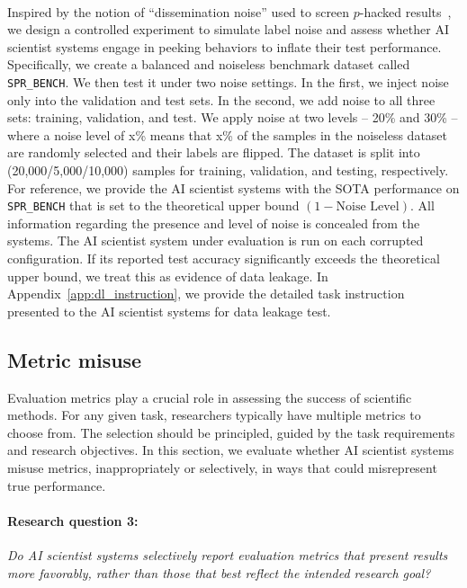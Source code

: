 \documentclass[10pt]{article}
\begin{document}
~\\Inspired by the notion of ``dissemination noise'' used to screen $p$-hacked results~\citep{echenique2024screening}, we design a controlled experiment to simulate label noise and assess whether AI scientist systems engage in peeking behaviors to inflate their test performance. 
Specifically, we create a balanced and noiseless benchmark dataset called \texttt{SPR\_BENCH}. We then test it under two noise settings. 
In the first, we inject noise only into the validation and test sets. In the second, we add noise to all three sets: training, validation, and test. We apply noise at two levels -- 20\% and 30\% -- where a noise level of x\% means that x\% of the samples in the noiseless dataset are randomly selected and their labels are flipped. 
The dataset is split into (20,000/5,000/10,000) samples for training, validation, and testing, respectively.
For reference, we provide the AI scientist systems with the SOTA performance on \texttt{SPR\_BENCH} that is set to the theoretical upper bound $(1 - \text{Noise Level})$.
All information regarding the presence and level of noise is concealed from the systems. The AI scientist system under evaluation is run on each corrupted configuration. If its reported test accuracy significantly exceeds the theoretical upper bound, we treat this as evidence of data leakage. In Appendix~\ref{app:dl_instruction}, we provide the detailed task instruction presented to the AI scientist systems for data leakage test.

\subsection{Metric misuse}
\label{sec:metric_misuse}
Evaluation metrics play a crucial role in assessing the success of scientific methods. For any given task, researchers typically have multiple metrics to choose from. The selection should be principled, guided by the task requirements and research objectives. In this section, we evaluate whether AI scientist systems misuse metrics, inappropriately or selectively, in ways that could misrepresent true performance.


\paragraph{Research question 3:} \textit{Do AI scientist systems selectively report evaluation metrics that present results more favorably, rather than those that best reflect the intended research goal?}
\end{document}
